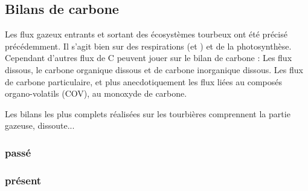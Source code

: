 \subsection{Bilans de carbone}

Les flux gazeux entrants et sortant des écosystèmes tourbeux ont été précisé précédemment.
Il s'agit bien sur des respirations (\COO et \CHH) et de la photosynthèse.
Cependant d'autres flux de C peuvent jouer sur le bilan de carbone : 
Les flux dissous, le carbone organique dissous et de carbone inorganique dissous.
Les flux de carbone particulaire, et plus anecdotiquement les flux liées au composés organo-volatils (COV), au monoxyde de carbone.

Les bilans les plus complets réalisées sur les tourbières comprennent la partie gazeuse, dissoute...

\subsubsection{passé}

\subsubsection{présent}

